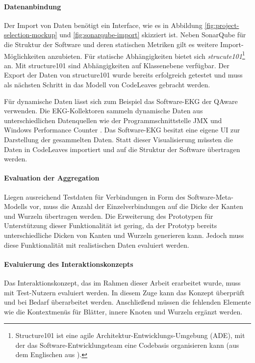 \paragraph{Datenanbindung} 

Der Import von Daten benötigt ein Interface, wie es in Abbildung \ref{fig:project-selection-mockup} und \ref{fig:sonarqube-import} skizziert ist. Neben SonarQube für die Struktur der Software und deren statischen Metriken gilt es weitere Import-Möglichkeiten anzubieten. Für statische Abhängigkeiten bietet sich \textit{strucute101}\footnote{Structure101 ist eine agile Architektur-Entwicklungs-Umgebung (ADE), mit der das Software-Entwicklungsteam eine Codebasis organisieren kann (aus dem Englischen aus \cite{headway2017structure101}).} an. Mit structure101 sind Abhängigkeiten auf Klassenebene verfügbar. Der Export der Daten von structure101 wurde bereits erfolgreich getestet und muss als nächsten Schritt in das Modell von CodeLeaves gebracht werden.

Für dynamische Daten lässt sich zum Beispiel das Software-EKG der QAware verwenden. Die EKG-Kollektoren sammeln dynamische Daten aus unterschiedlichen Datenquellen wie der Programmschnittstelle JMX und Windows Performance Counter \cite{weigend2011dynamische}. Das Software-EKG besitzt eine eigene UI zur Darstellung der gesammelten Daten. Statt dieser Visualisierung müssten die Daten in CodeLeaves importiert und auf die Struktur der Software übertragen werden.

\paragraph{Evaluation der Aggregation}

Liegen ausreichend Testdaten für Verbindungen in Form des Software-Meta-Modells vor, muss die Anzahl der Einzelverbindungen auf die Dicke der Kanten und Wurzeln übertragen werden. Die Erweiterung des Prototypen für Unterstützung dieser Funktionalität ist gering, da der Prototyp bereits unterschiedliche Dicken von Kanten und Wurzeln generieren kann. Jedoch muss diese Funktionalität mit realistischen Daten evaluiert werden.

\paragraph{Evaluierung des Interaktionskonzepts}

Das Interaktionskonzept, das im Rahmen dieser Arbeit erarbeitet wurde, muss mit Test-Nutzern evaluiert werden. In diesem Zuge kann das Konzept überprüft und bei Bedarf überarbeitet werden. Anschließend müssen die fehlenden Elemente wie die Kontextmenüs für Blätter, innere Knoten und Wurzeln ergänzt werden.\\

